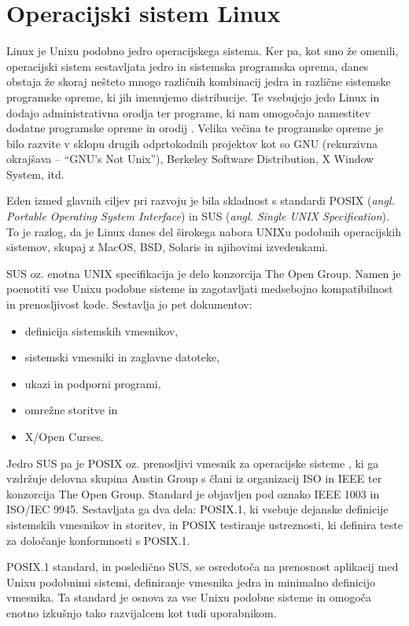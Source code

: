 \documentclass[a4paper,12pt,openright]{book}
\begin{document}
\section{Operacijski sistem Linux}

Linux je Unixu podobno jedro operacijskega sistema.
Ker pa, kot smo že omenili, operacijski sistem sestavljata jedro in sistemska programska oprema, danes obstaja že skoraj nešteto mnogo različnih kombinacij jedra in različne sistemske programske opreme, ki jih imenujemo distribucije.
Te vsebujejo jedo Linux in dodajo administrativna orodja ter programe, ki nam omogočajo namestitev dodatne programske opreme in orodij \cite{Silberschatz_Galvin_Gagne_2018}.
Velika večina te programske opreme je bilo razvite v sklopu drugih odprtokodnih projektov kot so GNU (rekurzivna okrajšava -- ``GNU's Not Unix''), Berkeley Software Distribution, X Window System, itd.

Eden izmed glavnih ciljev pri razvoju je bila skladnost s standardi POSIX (\textit{angl. Portable Operating System Interface}) in SUS (\textit{angl. Single UNIX Specification}).
To je razlog, da je Linux danes del širokega nabora UNIXu podobnih operacijskih sistemov, skupaj z MacOS, BSD, Solaris in njihovimi izvedenkami.

SUS oz. enotna UNIX specifikacija \cite{SUS_2020} je delo konzorcija The Open Group.
Namen je poenotiti vse Unixu podobne sisteme in zagotavljati medsebojno kompatibilnost in prenosljivost kode.
Sestavlja jo pet dokumentov:
\begin{itemize}
	\item definicija sistemskih vmesnikov,
	\item sistemski vmesniki in zaglavne datoteke,
	\item ukazi in podporni programi,
	\item omrežne storitve in
	\item X/Open Curses.
\end{itemize}

Jedro SUS pa je POSIX oz. prenosljivi vmesnik za operacijske sisteme \cite{POSIX.1_2024}, ki ga vzdržuje delovna skupina Austin Group s člani iz organizacij ISO in IEEE ter konzorcija The Open Group.
Standard je objavljen pod oznako IEEE 1003 in ISO/IEC 9945.
Sestavljata ga dva dela: POSIX.1, ki vsebuje dejanske definicije sistemskih vmesnikov in storitev, in POSIX testiranje ustreznosti, ki definira teste za določanje konformnosti s POSIX.1.

POSIX.1 standard, in posledično SUS, se osredotoča na prenosnost aplikacij med Unixu podobnimi sistemi, definiranje vmesnika jedra in minimalno definicijo vmesnika.
Ta standard je osnova za vse Unixu podobne sisteme in omogoča enotno izkušnjo tako razvijalcem kot tudi uporabnikom.
\end{document}
